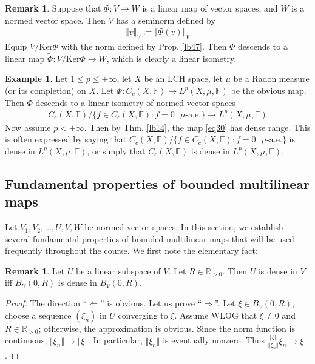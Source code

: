\documentclass[12pt,b5paper,notitlepage]{article}
\theoremstyle{definition}
\newtheorem{eg}[df]{Example}
\newtheorem{rem}[df]{Remark}
\theoremstyle{plain}
\newcommand{\wtd}{\widetilde}
\newcommand{\ovl}{\overline}
\newcommand{\Rbb}{\mathbb R}
\newcommand{\Ker}{\mathrm{Ker}}
\newcommand{\Fbb}{\mathbb F}
\numberwithin{equation}{section}
\begin{document}
\begin{rem}
Suppose that $\Phi:V\rightarrow W$ is a linear map of vector spaces, and $W$ is a normed vector space. Then $V$ has a seminorm defined by
\begin{align*}
\Vert v\Vert_V:=\Vert \Phi(v)\Vert_V
\end{align*}
Equip $V/\Ker\Phi$ with the norm defined by Prop. \ref{lb47}. Then $\Phi$ descends to a linear map $\wtd\Phi:V/\Ker\Phi\rightarrow W$, which is clearly a linear isometry. 
\end{rem}

\begin{eg}\label{lb48}
Let $1\leq p\leq+\infty$, let $X$ be an LCH space, let $\mu$ be a Radon measure (or its completion) on $X$. Let $\Phi:C_c(X,\Fbb)\rightarrow L^p(X,\mu,\Fbb)$ be the obvious map. Then $\Phi$ descends to a linear isometry of normed vector spaces
\begin{gather}\label{eq30}
C_c(X,\Fbb)\big/\big\{f\in C_c(X,\Fbb):f=0\text{ $\mu$-a.e.}\big\}\longrightarrow L^p(X,\mu,\Fbb)
\end{gather}
Now assume $p<+\infty$. Then by Thm. \ref{lb14}, the map \eqref{eq30} has dense range. This is often expressed by saying that $C_c(X,\Fbb)\big/\big\{f\in C_c(X,\Fbb):f=0\text{ $\mu$-a.e.}\big\}$ is dense in $L^p(X,\mu,\Fbb)$, or simply that $C_c(X,\Fbb)$ is dense in $L^p(X,\mu,\Fbb)$.
\end{eg}





\subsection{Fundamental properties of bounded multilinear maps}

Let $V_1,V_2,\dots,U,V,W$ be normed vector spaces. In this section, we establish several fundamental properties of bounded multilinear maps that will be used frequently throughout the course. We first note the elementary fact:

\begin{rem}\label{lb29}
Let $U$ be a linear subspace of $V$. Let $R\in\Rbb_{>0}$. Then $U$ is dense in $V$ iff $\ovl B_U(0,R)$ is dense in $\ovl B_V(0,R)$. 
\end{rem}

\begin{proof}
The direction ``$\Leftarrow$'' is obvious. Let us prove ``$\Rightarrow$''. Let $\xi\in\ovl B_V(0,R)$, choose a sequence $(\xi_n)$ in $U$ converging to $\xi$. Assume WLOG that $\xi\neq0$ and $R\in\Rbb_{>0}$; otherwise, the approximation is obvious. Since the norm function is continuous, $\Vert\xi_n\Vert\rightarrow\Vert\xi\Vert$. In particular, $\Vert\xi_n\Vert$ is eventually nonzero. Thus $\frac{\Vert\xi\Vert}{\Vert\xi_n\Vert}\xi_n\rightarrow \xi$.
\end{proof}
\end{document}
